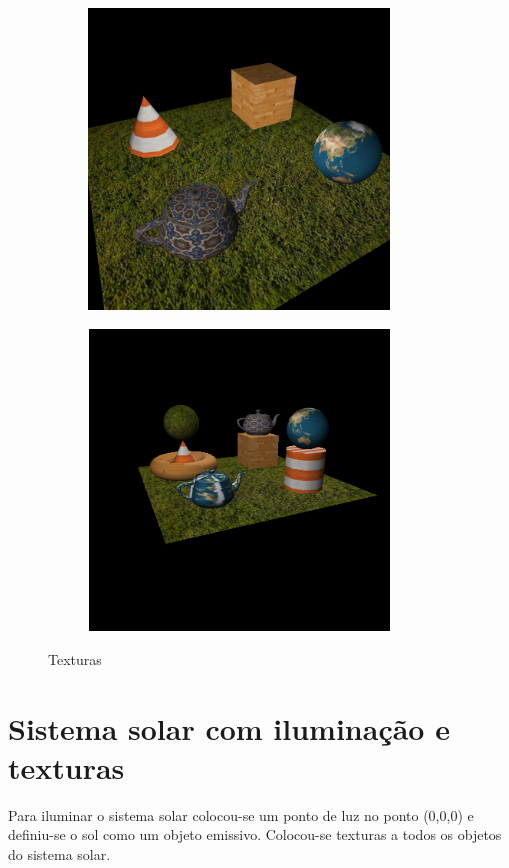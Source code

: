 \documentclass[11pt,a4paper]{report}
\begin{document}
\vspace{1cm}
\begin{figure}[H]
\centering
\begin{subfigure}{0.5\textwidth}
  \centering
  \includegraphics[width = 8cm,height = 8cm]{test_4_7.png}
  \caption{\texttt{}}
  \label{fig:test_4_7}
\end{subfigure}%
\begin{subfigure}{0.5\textwidth}
  \centering
  \includegraphics[width = 8cm,height = 8cm]{test_tex.png}
  \caption{\texttt{}}
  \label{fig:test_tex}
\end{subfigure}
\label{fig:texturas}
\caption{Texturas}
\end{figure}

\newpage
\section{Sistema solar com iluminação e texturas}

Para iluminar o sistema solar colocou-se um ponto de luz no ponto (0,0,0) e definiu-se o sol como um objeto emissivo.
Colocou-se texturas a todos os objetos do sistema solar.
\end{document}
